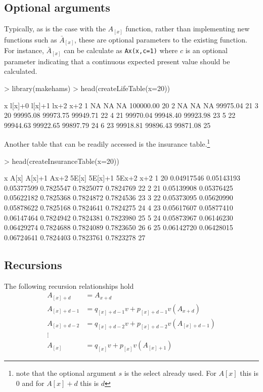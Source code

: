 \documentclass{report}
\begin{document}
\subsection*{Optional arguments}
Typically, as is the case with the $A_{[x]}$ function, rather than implementing new functions such as $\bar{A}_{[x]}$, these are optional parameters to the existing function. For instance, $\bar{A}_{[x]}$ can be calculate as \texttt{Ax(x,c=1)} where $c$ is an optional parameter indicating that a continuous expected present value should be calculated.

\begin{Schunk}
\begin{Sinput}
> library(makehams)
> head(createLifeTable(x=20))
\end{Sinput}
\begin{Soutput}
   x   l[x]+0   l[x]+1      lx+2 x+2
1 NA       NA       NA 100000.00  20
2 NA       NA       NA  99975.04  21
3 20 99995.08 99973.75  99949.71  22
4 21 99970.04 99948.40  99923.98  23
5 22 99944.63 99922.65  99897.79  24
6 23 99918.81 99896.43  99871.08  25
\end{Soutput}
\end{Schunk}

Another table that can be readily accessed is the insurance table.\footnote{note that the optional argument $s$ is the select already used. For $A[x]$ this is 0 and for $A[x]+d$ this is $d$}
\begin{Schunk}
\begin{Sinput}
> head(createInsuranceTable(x=20))
\end{Sinput}
\begin{Soutput}
   x       A[x]     A[x]+1       Ax+2     5E[x]   5E[x]+1     5Ex+2 x+2
1 20 0.04917546 0.05143193 0.05377599 0.7825547 0.7825077 0.7824769  22
2 21 0.05139908 0.05376425 0.05622182 0.7825368 0.7824872 0.7824536  23
3 22 0.05373095 0.05620990 0.05878622 0.7825168 0.7824641 0.7824275  24
4 23 0.05617607 0.05877410 0.06147464 0.7824942 0.7824381 0.7823980  25
5 24 0.05873967 0.06146230 0.06429274 0.7824688 0.7824089 0.7823650  26
6 25 0.06142720 0.06428015 0.06724641 0.7824403 0.7823761 0.7823278  27
\end{Soutput}
\end{Schunk}

\subsection*{Recursions}
The following recursion relationships hold
\begin{align*}
A_{[x]+d} &= A_{x+d} \\
A_{[x]+d-1} &= q_{[x]+d-1}v + p_{[x]+d-1}v(A_{x+d}) \\
A_{[x]+d-2} &= q_{[x]+d-2}v + p_{[x]+d-2}v(A_{[x]+d-1}) \\
\vdots \\
A_{[x]} &= q_{[x]}v + p_{[x]}v(A_{[x]+1})
\end{align*}
\end{document}
